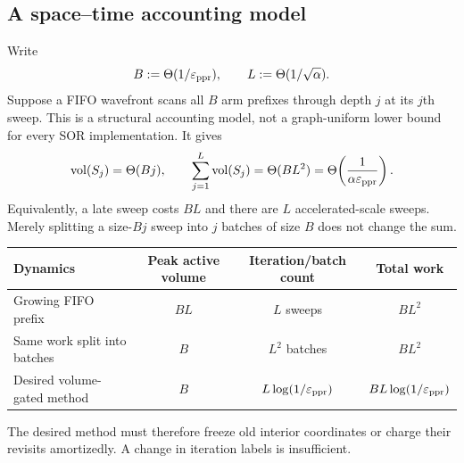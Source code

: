 \subsection{A space--time accounting model}

Write
\begin{equation}
  B:=\Theta(1/\varepsilon_{\mathrm{ppr}}),
  \qquad L:=\Theta(1/\sqrt\alpha).
  \label{eq:B-L}
\end{equation}
Suppose a FIFO wavefront scans all $B$ arm prefixes through depth $j$ at its
$j$th sweep.  This is a structural accounting model, not a graph-uniform
lower bound for every SOR implementation.  It gives
\begin{equation}
 \operatorname{vol}(S_j)=\Theta(Bj),
 \qquad
 \sum_{j=1}^{L}\operatorname{vol}(S_j)
 =\Theta(BL^2)
 =\Theta\!\left(\frac1{\alpha\varepsilon_{\mathrm{ppr}}}\right).
 \label{eq:triangular-work}
\end{equation}
Equivalently, a late sweep costs $BL$ and there are $L$ accelerated-scale
sweeps.  Merely splitting a size-$Bj$ sweep into $j$ batches of size $B$ does
not change the sum.

\begin{center}
\begin{tabular}{@{}lccc@{}}
\toprule
Dynamics & Peak active volume & Iteration/batch count & Total work \\
\midrule
Growing FIFO prefix & $BL$ & $L$ sweeps & $BL^2$ \\
Same work split into batches & $B$ & $L^2$ batches & $BL^2$ \\
Desired volume-gated method & $B$ & $L\log(1/\varepsilon_{\mathrm{ppr}})$ & $BL\log(1/\varepsilon_{\mathrm{ppr}})$ \\
\bottomrule
\end{tabular}
\end{center}

The desired method must therefore freeze old interior coordinates or charge
their revisits amortizedly.  A change in iteration labels is insufficient.
